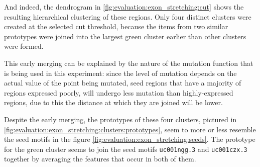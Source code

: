 \documentclass[parskip]{cs4rep}
\newcommand{\gene}[1]{{\tt #1}}
\begin{document}
And indeed, the dendrogram in \autoref{fig:evaluation:exon_stretching:cut} shows the resulting hierarchical clustering of these regions. Only four distinct clusters were created at the selected cut threshold, because the items from two similar prototypes were joined into the largest green cluster earlier than other clusters were formed. 

This early merging can be explained by the nature of the mutation function that is being used in this experiment: since the level of mutation depends on the actual value of the point being mutated, seed regions that have a majority of regions expressed poorly, will undergo less mutation than highly-expressed regions, due to this the distance at which they are joined will be lower. 

Despite the early merging, the prototypes of these four clusters, pictured in  \autoref{fig:evaluation:exon_stretching:clusters:prototypes}, seem to more or less resemble the seed motifs in the figure \autoref{fig:evaluation:exon_stretching:seeds}. The prototype for the green cluster seems to join the seed motifs \gene{uc001ngg.3} and \gene{uc001czx.3} together by averaging the features that occur in both of them.
\end{document}
